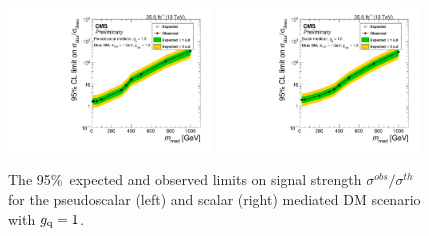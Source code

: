 \begin{figure}[hbtp]
  \centering
   \includegraphics[width=0.48\textwidth]{figures/mu_13TeV_NLOP_Mchi_1.pdf}
   \includegraphics[width=0.48\textwidth]{figures/mu_13TeV_NLOS_Mchi_1.pdf}
  \caption{
    The 95\%~\CL expected and observed limits on signal strength $\sigma^{obs}/\sigma^{th}$
    for the pseudoscalar (left) and scalar (right) mediated DM scenario with $g_{\rm q}=1$.
  } 
  \label{fig:DM13TeV_MS_MX_gq-1}
\end{figure}

